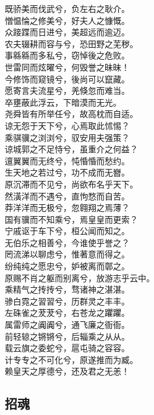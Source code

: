 \documentclass[]{article}
\begin{document}
既骄美而伐武兮，负左右之耿介。\\
憎愠惀之修美兮，好夫人之慷慨。\\
众踥蹀而日进兮，美超远而逾迈。\\
农夫辍耕而容与兮，恐田野之芜秽。\\
事緜緜而多私兮，窃悼後之危败。\\
世雷同而炫曜兮，何毁誉之昧昧！\\
今修饰而窥镜兮，後尚可以竄藏。\\
愿寄言夫流星兮，羌倏忽而难当。\\
卒壅蔽此浮云，下暗漠而无光。\\
尧舜皆有所举任兮，故高枕而自适。\\
谅无怨于天下兮，心焉取此怵惕？\\
乘骐骥之浏浏兮，驭安用夫强策？\\
谅城郭之不足恃兮，虽重介之何益？\\
邅翼翼而无终兮，忳惛惛而愁约。\\
生天地之若过兮，功不成而无嶜。\\
原沉滞而不见兮，尚欲布名乎天下。\\
然潢洋而不遇兮，直怐愗而自苦。\\
莽洋洋而无极兮，忽翱翔之焉薄？\\
国有骥而不知乘兮，焉皇皇而更索？\\
宁戚讴于车下兮，桓公闻而知之。\\
无伯乐之相善兮，今谁使乎誉之？\\
罔流涕以聊虑兮，惟著意而得之。\\
纷纯纯之愿忠兮，妒被离而鄣之。\\
原赐不肖之躯而别离兮，放游志乎云中。\\
乘精气之抟抟兮，骛诸神之湛湛。\\
骖白霓之習習兮，历群灵之丰丰。\\
左硃雀之茇茇兮，右苍龙之躣躣。\\
属雷师之阗阗兮，通飞廉之衙衙。\\
前轻辌之锵锵兮，后辎乘之从从。\\
载云旗之委蛇兮，扈屯骑之容容。\\
计专专之不可化兮，原遂推而为臧。\\
赖皇天之厚德兮，还及君之无恙！

\hypertarget{header-n2924}{%
\subsection{招魂}\label{header-n2924}}
\end{document}
